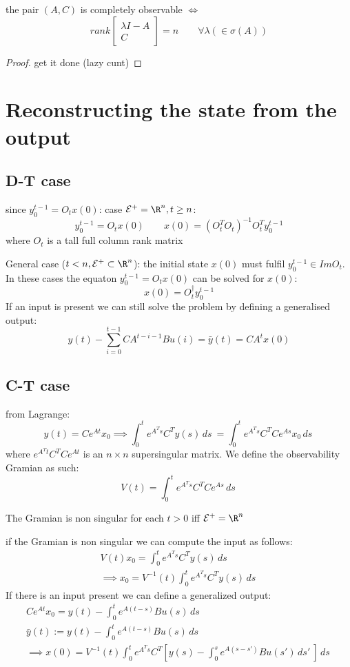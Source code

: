 \documentclass[english]{lectures}
\begin{document}
\begin{theorem}
    the pair $(A,C)$ is completely observable $\iff$ 
    \[
    rank\begin{bmatrix}
        \lambda I- A \\ C
    \end{bmatrix}=n \qquad \forall \lambda (\in \sigma(A))
    \]
\end{theorem}
\begin{proof}
    get it done (lazy cunt)
\end{proof}

\section{Reconstructing the state from the output}
\subsection{D-T case}
since $y_0^{t-1}=O_tx(0)$:
case $\mathcal{E}^+=\R^n, t\geq n$:
\[
    y_0^{t-1}=O_tx(0) \qquad x(0)=(O_t^TO_t)^{-1}O_t^Ty_0^{t-1}
\]
where $O_t$ is a tall full column rank matrix

General case ($t<n, \mathcal{E}^+\subset \R^n$): the initial state $x(0)$ must fulfil $y_0^{t-1}\in ImO_t$. In these cases the equaton $y_0^{t-1}=O_tx(0)$ can be solved for $x(0)$:
\[
x(0)=O_t^{\dagger}y_0^{t-1}
\]
If an input is present we can still solve the problem by defining a generalised output:
\[
    y(t)-\sum_{i=0}^{t-1}CA^{t-i-1}Bu(i)=\bar{y}(t)=CA^tx(0)
\]
\subsection{C-T case}
from Lagrange:
\[
y(t)=Ce^{At}x_0 \implies \int_0^te^{A^Ts}C^Ty(s)\,ds\ = \int_0^te^{A^Ts}C^TCe^{As}x_0\,ds\
\]
where $e^{A^Tt}C^TCe^{At}$ is an $n \times n$ supersingular matrix.
We define the observability Gramian as such:
\[
V(t)=\int_0^te^{A^Ts}C^TCe^{As}\,ds\
\]
\begin{result}
    The Gramian is non singular for each $t>0$ iff $\mathcal{E}^+=\R^n$
\end{result}
if the Gramian is non singular we can compute the input as follows:
\begin{align*}
    V(t)x_0=\int_0^te^{A^Ts}C^Ty(s)\,ds\ \\
    \implies x_0=V^{-1}(t)\int_0^te^{A^Ts}C^Ty(s)\,ds\
\end{align*}
If there is an input present we can define a generalized output:
\begin{gather*}
    Ce^{At}x_0=y(t) - \int_0^t e^{A(t-s)}Bu(s)\,ds\ \\
    \bar{y}(t):=y(t)-\int_0^t e^{A(t-s)}Bu(s)\,ds\ \\
    \implies x(0)=V^{-1}(t)\int_0^t {e^{A^Ts}C^T \left[ y(s) - \int_0^s e^{A(s-s')}Bu(s') \, ds'\ \right]} \, ds\
\end{gather*}
\end{document}
